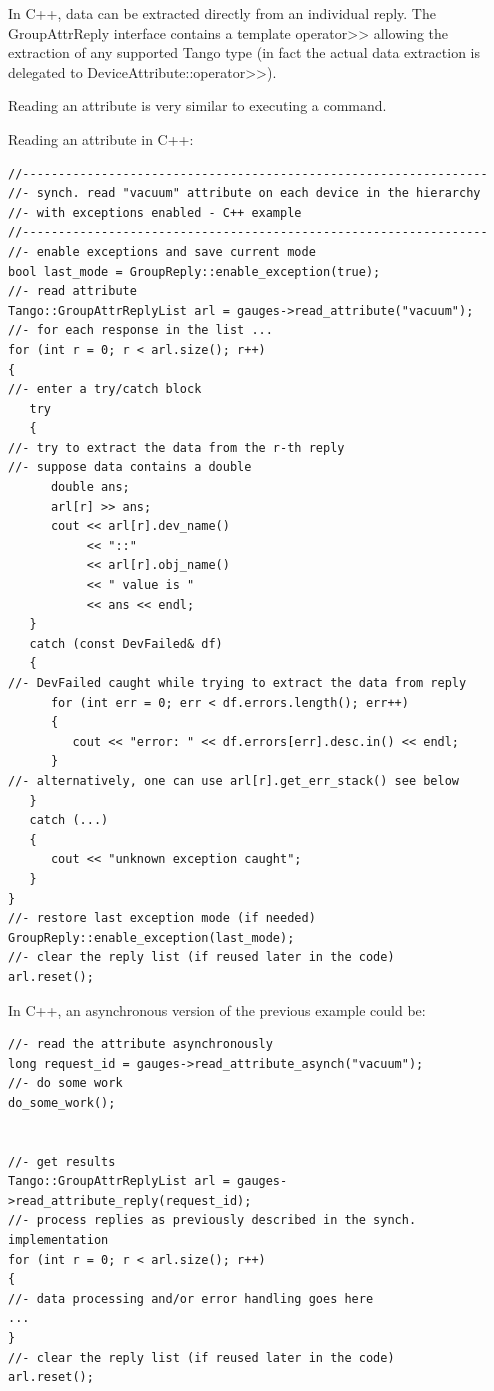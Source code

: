 In C++, data can be extracted directly from an individual reply. The
GroupAttrReply interface contains a template operator>\textcompwordmark{}>
allowing the extraction of any supported Tango type (in fact the actual
data extraction is delegated to DeviceAttribute::operator>\textcompwordmark{}>). 

Reading an attribute is very similar to executing a command. 

Reading an attribute in C++:


\begin{verbatim}
//-----------------------------------------------------------------
//- synch. read "vacuum" attribute on each device in the hierarchy
//- with exceptions enabled - C++ example
//-----------------------------------------------------------------
//- enable exceptions and save current mode
bool last_mode = GroupReply::enable_exception(true);
//- read attribute
Tango::GroupAttrReplyList arl = gauges->read_attribute("vacuum");
//- for each response in the list ...
for (int r = 0; r < arl.size(); r++)
{
//- enter a try/catch block
   try
   {
//- try to extract the data from the r-th reply
//- suppose data contains a double
      double ans;
      arl[r] >> ans;
      cout << arl[r].dev_name()
           << "::"
           << arl[r].obj_name()
           << " value is "
           << ans << endl;
   }
   catch (const DevFailed& df)
   {
//- DevFailed caught while trying to extract the data from reply
      for (int err = 0; err < df.errors.length(); err++)
      {
         cout << "error: " << df.errors[err].desc.in() << endl;
      }
//- alternatively, one can use arl[r].get_err_stack() see below
   }
   catch (...)
   {
      cout << "unknown exception caught";
   }
}
//- restore last exception mode (if needed)
GroupReply::enable_exception(last_mode);
//- clear the reply list (if reused later in the code)
arl.reset();
\end{verbatim}


In C++, an asynchronous version of the previous example could be:


\begin{verbatim}
//- read the attribute asynchronously
long request_id = gauges->read_attribute_asynch("vacuum");
//- do some work
do_some_work();
 
 
//- get results
Tango::GroupAttrReplyList arl = gauges->read_attribute_reply(request_id);
//- process replies as previously described in the synch. implementation
for (int r = 0; r < arl.size(); r++)
{
//- data processing and/or error handling goes here
...
}
//- clear the reply list (if reused later in the code)
arl.reset();
\end{verbatim}



